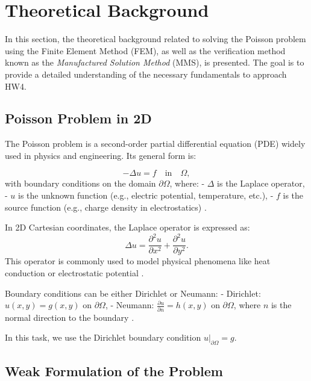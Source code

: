 \section{Theoretical Background}

In this section, the theoretical background related to solving the Poisson problem using the Finite Element Method (FEM), as well as the verification method known as the \textit{Manufactured Solution Method} (MMS), is presented. The goal is to provide a detailed understanding of the necessary fundamentals to approach HW4.

\subsection{Poisson Problem in 2D}

The Poisson problem is a second-order partial differential equation (PDE) widely used in physics and engineering. Its general form is:

\begin{equation}
    -\Delta u = f \quad \text{in} \quad \Omega,
\end{equation}
with boundary conditions on the domain \(\partial \Omega\), where:
- \(\Delta\) is the Laplace operator,
- \(u\) is the unknown function (e.g., electric potential, temperature, etc.),
- \(f\) is the source function (e.g., charge density in electrostatics) \cite{poisson_equation}.

In 2D Cartesian coordinates, the Laplace operator is expressed as:
\begin{equation}
    \Delta u = \frac{\partial^2 u}{\partial x^2} + \frac{\partial^2 u}{\partial y^2}.
\end{equation}
This operator is commonly used to model physical phenomena like heat conduction or electrostatic potential \cite{laplace_operator}.

Boundary conditions can be either Dirichlet or Neumann:
- Dirichlet: \(u(x,y) = g(x,y)\) on \(\partial \Omega\),
- Neumann: \(\frac{\partial u}{\partial n} = h(x,y)\) on \(\partial \Omega\), where \(n\) is the normal direction to the boundary \cite{boundary_conditions}.

In this task, we use the Dirichlet boundary condition \(u|_{\partial \Omega} = g\).

\subsection{Weak Formulation of the Problem}


